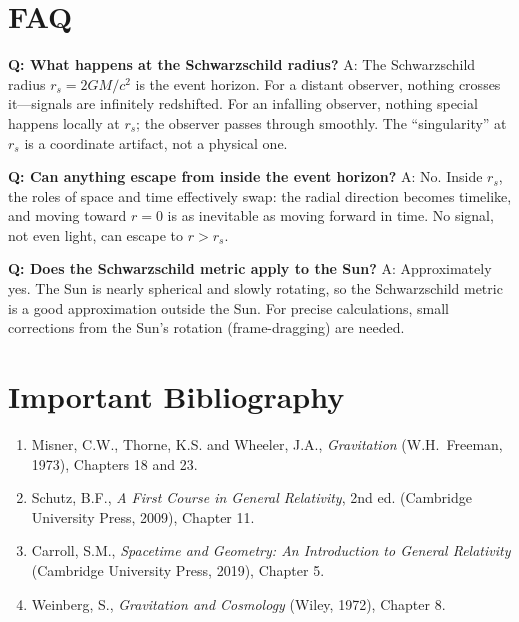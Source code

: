 \section*{FAQ}

\textbf{Q: What happens at the Schwarzschild radius?}
A: The Schwarzschild radius $r_s = 2GM/c^2$ is the event horizon. For a distant observer, nothing crosses it---signals are infinitely redshifted. For an infalling observer, nothing special happens locally at $r_s$; the observer passes through smoothly. The ``singularity'' at $r_s$ is a coordinate artifact, not a physical one.

\textbf{Q: Can anything escape from inside the event horizon?}
A: No. Inside $r_s$, the roles of space and time effectively swap: the radial direction becomes timelike, and moving toward $r = 0$ is as inevitable as moving forward in time. No signal, not even light, can escape to $r > r_s$.

\textbf{Q: Does the Schwarzschild metric apply to the Sun?}
A: Approximately yes. The Sun is nearly spherical and slowly rotating, so the Schwarzschild metric is a good approximation outside the Sun. For precise calculations, small corrections from the Sun's rotation (frame-dragging) are needed.
\section*{Important Bibliography}

\begin{enumerate}
\item Misner, C.W., Thorne, K.S. and Wheeler, J.A., \textit{Gravitation} (W.H.\ Freeman, 1973), Chapters 18 and 23.
\item Schutz, B.F., \textit{A First Course in General Relativity}, 2nd ed. (Cambridge University Press, 2009), Chapter 11.
\item Carroll, S.M., \textit{Spacetime and Geometry: An Introduction to General Relativity} (Cambridge University Press, 2019), Chapter 5.
\item Weinberg, S., \textit{Gravitation and Cosmology} (Wiley, 1972), Chapter 8.
\end{enumerate}

